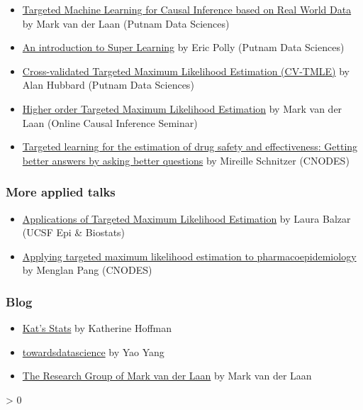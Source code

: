 \documentclass[
]{book}
\providecommand{\tightlist}{%
  \setlength{\itemsep}{0pt}\setlength{\parskip}{0pt}}
\newlength{\cslhangindent}
\newenvironment{CSLReferences}[2] %
 {%
  \setlength{\parindent}{0pt}
  \ifodd #1 \everypar{\setlength{\hangindent}{\cslhangindent}}\ignorespaces\fi
  \ifnum #2 > 0
  \setlength{\parskip}{#2\baselineskip}
  \fi
 }%
 {}
\begin{document}
\begin{itemize}
\tightlist
\item
  \href{https://www.youtube.com/watch?v=PrPNP5RVcLg}{Targeted Machine Learning for Causal Inference based on Real World Data} by Mark van der Laan (Putnam Data Sciences)
\item
  \href{https://www.youtube.com/watch?v=1zT17HtvtF8}{An introduction to Super Learning} by Eric Polly (Putnam Data Sciences)
\item
  \href{https://www.youtube.com/watch?v=MDmddX267Ys}{Cross-validated Targeted Maximum Likelihood Estimation (CV-TMLE)} by Alan Hubbard (Putnam Data Sciences)
\item
  \href{https://www.youtube.com/watch?v=2jumfnRQpxs}{Higher order Targeted Maximum Likelihood Estimation} by Mark van der Laan (Online Causal Inference Seminar)
\item
  \href{http://bcooltv.mcgill.ca/FDownloader.aspx?rid=e3143be2-918d-49d9-82ce-4dfea75ef1dc\&DLType=VGAMP4}{Targeted learning for the estimation of drug safety and effectiveness: Getting better answers by asking better questions} by Mireille Schnitzer (CNODES)
\end{itemize}

\hypertarget{more-applied-talks}{%
\subsubsection{More applied talks}\label{more-applied-talks}}

\begin{itemize}
\tightlist
\item
  \href{https://www.youtube.com/watch?v=foY7HoCeo88}{Applications of Targeted Maximum Likelihood Estimation} by Laura Balzar (UCSF Epi \& Biostats)
\item
  \href{https://www.cnodes.ca/online-lecture/targeted-learning-estimation/}{Applying targeted maximum likelihood estimation to pharmacoepidemiology} by Menglan Pang (CNODES)
\end{itemize}

\hypertarget{blog}{%
\subsubsection{Blog}\label{blog}}

\begin{itemize}
\tightlist
\item
  \href{https://www.khstats.com/}{Kat's Stats} by Katherine Hoffman
\item
  \href{https://towardsdatascience.com/targeted-maximum-likelihood-tmle-for-causal-inference-1be88542a749}{towardsdatascience} by Yao Yang
\item
  \href{https://vanderlaan-lab.org/post/}{The Research Group of Mark van der Laan} by Mark van der Laan
\end{itemize}

\hypertarget{refs}{}
\begin{CSLReferences}{0}{0}
\end{CSLReferences}

  
\end{document}
